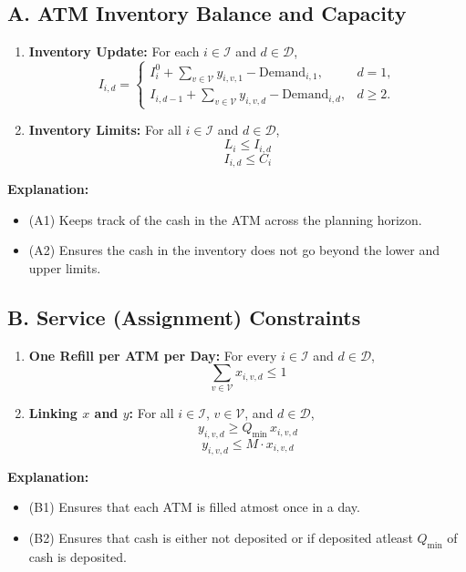 \documentclass[11pt]{article}
\begin{document}
\subsection*{A. ATM Inventory Balance and Capacity}
\begin{enumerate}[label=\textbf{(A\arabic*)}]
    \item \textbf{Inventory Update:} For each \(i \in \mathcal{I}\) and \(d \in \mathcal{D}\),
    \[
    I_{i,d} =
    \begin{cases}
    I_i^0 + \displaystyle\sum_{v \in \mathcal{V}} y_{i,v,1} - \text{Demand}_{i,1}, & d=1,\\[1mm]
    I_{i,d-1} + \displaystyle\sum_{v \in \mathcal{V}} y_{i,v,d} - \text{Demand}_{i,d}, & d \ge 2.
    \end{cases}
    \]
    \item \textbf{Inventory Limits:} For all \(i \in \mathcal{I}\) and \(d \in \mathcal{D}\),
    \[
        L_i \le I_{i,d}
    \]
    \[
        I_{i,d} \le C_i
    \]
\end{enumerate}

\noindent \textbf{Explanation:}
\begin{itemize}[leftmargin=1cm]
    \item (A1) Keeps track of the cash in the ATM across the planning horizon.
    \item (A2) Ensures the cash in the inventory does not go beyond the lower and upper limits.
\end{itemize}

\subsection*{B. Service (Assignment) Constraints}
\begin{enumerate}[label=\textbf{(B\arabic*)}]
    \item \textbf{One Refill per ATM per Day:} For every \(i \in \mathcal{I}\) and \(d \in \mathcal{D}\),
    \[
    \sum_{v \in \mathcal{V}} x_{i,v,d} \le 1
    \]
    \item \textbf{Linking \(x\) and \(y\):} For all \(i \in \mathcal{I}\), \(v \in \mathcal{V}\), and \(d \in \mathcal{D}\),
    \[
        y_{i,v,d} \ge Q_{\min} \, x_{i,v,d}
    \]
    \[
        y_{i,v,d} \le M\cdot x_{i,v,d}
    \]
\end{enumerate}

\noindent \textbf{Explanation:}
\begin{itemize}[leftmargin=1cm]
    \item (B1) Ensures that each ATM is filled atmost once in a day.
    \item (B2) Ensures that cash is either not deposited or if deposited atleast \(Q_{\min}\) of cash is deposited.
\end{itemize}
\end{document}
